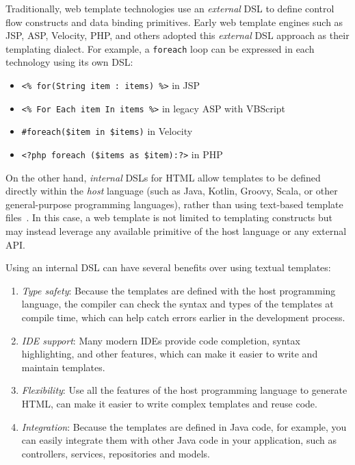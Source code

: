 \documentclass[software,article,accept,pdftex,moreauthors]{Definitions/mdpi}
\begin{document}
Traditionally, web template technologies use an \textit{external} DSL to define
control flow constructs and data binding primitives. Early web template engines
such as JSP, ASP, Velocity, PHP, and others adopted this \textit{external} DSL
approach as their templating dialect. For example, a \texttt{foreach} loop can
be expressed in each technology using its own DSL:
\begin{itemize}
  \item \texttt{<\% for(String item : items) \%>} in JSP
  \item \texttt{<\% For Each item In items \%>} in legacy ASP with VBScript
  \item \texttt{\#foreach(\$item in \$items)} in Velocity
  \item \texttt{<?php foreach (\$items as \$item):?>} in PHP
\end{itemize}

On the other hand, \textit{internal} DSLs for HTML allow templates to be
defined directly within the \emph{host} language (such as Java, Kotlin, Groovy,
Scala, or other general-purpose programming languages), rather than using
text-based template files~\cite{carvalho2020}. In this case, a web template
is not limited to templating constructs but may instead leverage any available
primitive of the host language or any external API.

Using an internal DSL can have several benefits over using textual templates:
\begin{enumerate}
  \item \emph{Type safety}: Because the templates are defined with the host
        programming language, the compiler can check the syntax and types of the
        templates at compile time, which can help catch errors earlier in the
        development process.

  \item \emph{IDE support}: Many modern IDEs provide code completion, syntax
        highlighting, and other features, which can make it easier to write and
        maintain templates.

  \item \emph{Flexibility}: Use all the features of the host programming language
        to generate HTML, can make it easier to write complex templates and reuse code.

  \item \emph{Integration}: Because the templates are defined in Java code, for
        example, you can easily integrate them with other Java code in your
        application, such as controllers, services, repositories and models.

\end{enumerate}
\end{document}
